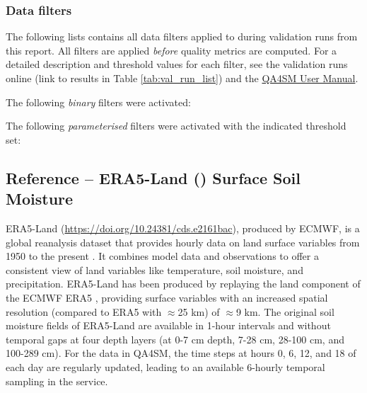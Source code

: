 \subsubsection{Data filters}

The following lists contains all data filters applied to  during validation runs from this report.
All filters are applied \textit{before} quality metrics are computed.
For a detailed description and threshold values for each filter, see the validation runs online (link to results in Table \ref{tab:val_run_list}) and the \href{https://qa4sm.eu/api/user-manual}{QA4SM User Manual}.

\noindent The following \textit{binary} filters were activated:
\begin{itemize}
\end{itemize}
\vspace{1em}
\noindent The following \textit{parameterised} filters were activated with the indicated threshold set:
\begin{itemize}
\end{itemize}


\subsection{Reference -- ERA5-Land () Surface Soil Moisture} \label{ssec:era5land}

\noindent ERA5-Land (\url{https://doi.org/10.24381/cds.e2161bac}), produced by \ac{ECMWF}, is a global reanalysis dataset that provides hourly data on land surface variables from 1950 to the present \citep{munozsabater2021}.
It combines model data and observations to offer a consistent view of land variables like temperature, soil moisture, and precipitation.
ERA5-Land has been produced by replaying the land component of the \ac{ECMWF} ERA5 \citep{hersbach2020}, providing surface variables with an increased spatial resolution (compared to ERA5 with $\approx$25 km) of $\approx$9 km.
The original soil moisture fields of ERA5-Land are available in 1-hour intervals and without temporal gaps at four depth layers (at 0-7 cm depth, 7-28 cm, 28-100 cm, and 100-289 cm).
For the data in \ac{QA4SM}, the time steps at hours 0, 6, 12, and 18 of each day are regularly updated, leading to an available 6-hourly temporal sampling in the service.

